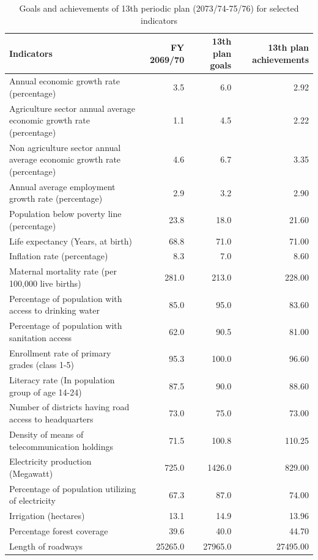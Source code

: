 \documentclass[
]{book}
\begin{document}
\begin{table}

\caption{\label{tab:forteenth-periodic-plan}Goals and achievements of 13th periodic plan (2073/74-75/76) for selected indicators}
\centering
\begin{tabular}[t]{lrrr}
\toprule
Indicators & FY 2069/70 & 13th plan goals & 13th plan achievements\\
\midrule
\rowcolor{gray!6}  Annual economic growth rate (percentage) & 3.5 & 6.0 & 2.92\\
Agriculture sector annual average economic growth rate (percentage) & 1.1 & 4.5 & 2.22\\
\rowcolor{gray!6}  Non agriculture sector annual average economic growth rate (percentage) & 4.6 & 6.7 & 3.35\\
Annual average employment growth rate (percentage) & 2.9 & 3.2 & 2.90\\
\rowcolor{gray!6}  Population below poverty line (percentage) & 23.8 & 18.0 & 21.60\\
\addlinespace
Life expectancy (Years, at birth) & 68.8 & 71.0 & 71.00\\
\rowcolor{gray!6}  Inflation rate (percentage) & 8.3 & 7.0 & 8.60\\
Maternal mortality rate (per 100,000 live births) & 281.0 & 213.0 & 228.00\\
\rowcolor{gray!6}  Percentage of population with access to drinking water & 85.0 & 95.0 & 83.60\\
Percentage of population with sanitation access & 62.0 & 90.5 & 81.00\\
\addlinespace
\rowcolor{gray!6}  Enrollment rate of primary grades (class 1-5) & 95.3 & 100.0 & 96.60\\
Literacy rate (In population group of age 14-24) & 87.5 & 90.0 & 88.60\\
\rowcolor{gray!6}  Number of districts having road access to headquarters & 73.0 & 75.0 & 73.00\\
Density of means of telecommunication holdings & 71.5 & 100.8 & 110.25\\
\rowcolor{gray!6}  Electricity production (Megawatt) & 725.0 & 1426.0 & 829.00\\
\addlinespace
Percentage of population utilizing of electricity & 67.3 & 87.0 & 74.00\\
\rowcolor{gray!6}  Irrigation (hectares) & 13.1 & 14.9 & 13.96\\
Percentage forest coverage & 39.6 & 40.0 & 44.70\\
\rowcolor{gray!6}  Length of roadways & 25265.0 & 27965.0 & 27495.00\\
\bottomrule
\end{tabular}
\end{table}
\end{document}
